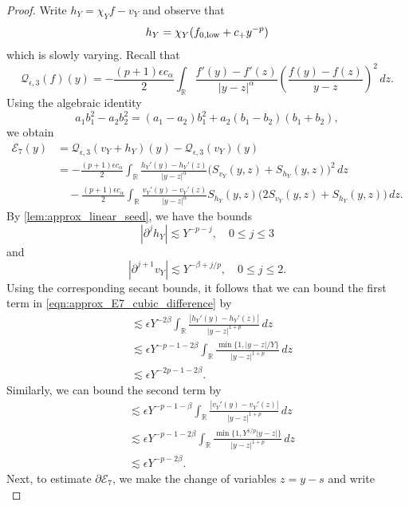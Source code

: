 \documentclass[11pt]{amsart}
\theoremstyle{definition}
\theoremstyle{remark}
\numberwithin{equation}{section}
\newcommand{\R}{\mathbb{R}}
\newcommand{\mc}[1]{\mathcal{#1}}
\begin{document}
\begin{proof}
    Write $h_{Y} = \chi_Y f - v_Y$ and observe that
    \[h_Y = \chi_Y(f_{0,\textup{low}} + c_+ y^{-p})\]
    which is slowly varying. Recall that 
    \[\mc{Q}_{\epsilon,3}(f)(y)
    =-\frac{(p+1)\epsilon c_\alpha}{2}\int_{\R}
    \frac{f'(y)-f'(z)}{|y-z|^\alpha}
    \left(\frac{f(y)-f(z)}{y-z}\right)^2\,dz.\]
    Using the algebraic identity
    \[a_1b_1^2 - a_2b_2^2 = (a_1-a_2)b_1^2 + a_2(b_1-b_2)(b_1+b_2),\]
    we obtain
    \begin{equation}\label{eqn:approx_E7_cubic_difference}
        \begin{aligned}
            \mc{E}_7(y) & = \mc{Q}_{\epsilon,3}(v_Y+h_Y)(y)-\mc{Q}_{\epsilon,3}(v_Y)(y) \\
            & = -\frac{(p+1)\epsilon c_\alpha}{2}\int_{\R}\frac{h_Y'(y)-h_Y'(z)}{|y-z|^\alpha}\bigl(S_{v_Y}(y,z)+S_{h_Y}(y,z)\bigr)^2\,dz \\
            & \quad -\frac{(p+1)\epsilon c_\alpha}{2}\int_{\R}\frac{v_Y'(y)-v_Y'(z)}{|y-z|^\alpha}S_{h_Y}(y,z)\bigl(2S_{v_Y}(y,z)+S_{h_Y}(y,z)\bigr)\,dz.
        \end{aligned}
    \end{equation}
    By \cref{lem:approx_linear_seed}, we have the bounds 
    \[|\partial^{j} h_Y| \lesssim Y^{-p - j}, \quad 0 \leq j \leq 3\]
    and 
    \[|\partial^{j+1} v_Y| \lesssim Y^{-\beta + j/p}, \quad 0 \leq j \leq 2.\]
    Using the corresponding secant bounds, it follows that we can bound the first term in \eqref{eqn:approx_E7_cubic_difference} by 
    \[\begin{aligned}&\lesssim \epsilon Y^{-2\beta} \int_{\R} \frac{|h_Y'(y) - h_Y'(z)|}{|y-z|^{1+p}}\,dz \\ &\lesssim \epsilon Y^{-p-1-2\beta}\int_{\R}\frac{\min\{1,|y-z|/Y\}}{|y-z|^{1+p}}\,dz \\ &\lesssim \epsilon Y^{-2p-1-2\beta}.\end{aligned}\]
    Similarly, we can bound the second term by 
    \[\begin{aligned}&\lesssim \epsilon Y^{-p-1-\beta}\int_{\R}\frac{|v_Y'(y)-v_Y'(z)|}{|y-z|^{1+p}}\,dz \\ &\lesssim \epsilon Y^{-p-1-2\beta}\int_{\R}\frac{\min\{1,Y^{1/p}|y-z|\}}{|y-z|^{1+p}}\,dz \\ &\lesssim \epsilon Y^{-p-2\beta}.\end{aligned}\]
    Next, to estimate $\partial \mc{E}_7$, we make the change of variables $z=y-s$ and write
    \begin{equation}\label{eqn:approx_E7_translated}

\end{equation}
\end{proof}
\end{document}
